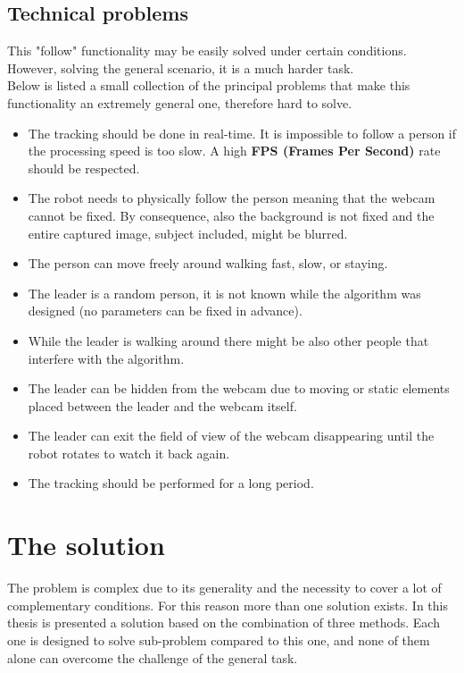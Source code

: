 \subsection{Technical problems}\label{sec:technicalProblems}
This "follow" functionality may be easily solved under certain conditions. However, solving the general scenario, it is a much harder task.\\
Below is listed a small collection of the principal problems that make this functionality an extremely general one, therefore hard to solve.
\begin{itemize}
	\item The tracking should be done in real-time. It is impossible to follow a person if the processing speed is too slow. A high \textbf{FPS (Frames Per Second)} rate should be respected.
	\item The robot needs to physically follow the person meaning that the webcam cannot be fixed. By consequence, also the background is not fixed and the entire captured image, subject included, might be blurred.
	\item The person can move freely around walking fast, slow, or staying.
	\item The leader is a random person, it is not known while the algorithm was designed (no parameters can be fixed in advance).
	\item While the leader is walking around there might be also other people that interfere with the algorithm.
	\item The leader can be hidden from the webcam due to moving or static elements placed between the leader and the webcam itself.
	\item The leader can exit the field of view of the webcam disappearing until the robot rotates to watch it back again.
	\item The tracking should be performed for a long period.
\end{itemize}


\section{The solution}
The problem is complex due to its generality and the necessity to cover a lot of complementary conditions. For this reason more than one solution exists. In this thesis is presented a solution based on the combination of three methods. Each one is designed to solve sub-problem compared to this one, and none of them alone can overcome the challenge of the general task.\\

